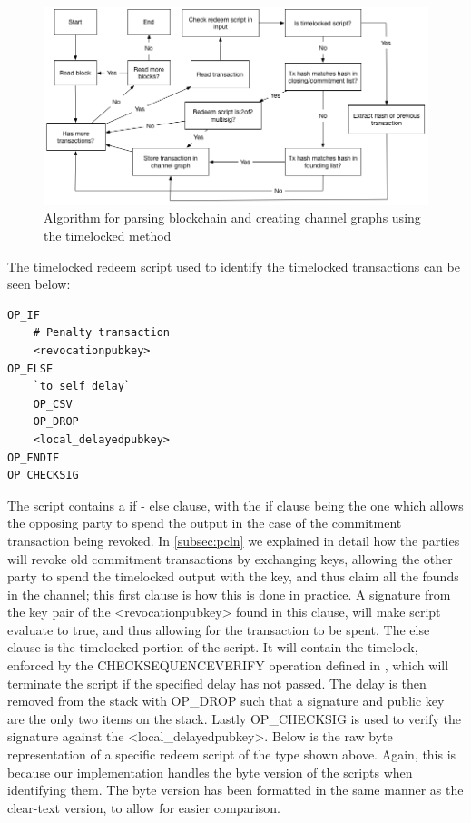 \begin{figure}[h]
    \centering
    \includegraphics[width=12cm]{figures/algo2.png}
    \caption{Algorithm for parsing blockchain and creating channel graphs using the timelocked method}
    \label{fig:algo2}
\end{figure}

The timelocked redeem script \cite{bolt3} used to identify the timelocked transactions can be seen below:

\begin{verbatim}
OP_IF
    # Penalty transaction
    <revocationpubkey>
OP_ELSE
    `to_self_delay`
    OP_CSV
    OP_DROP
    <local_delayedpubkey>
OP_ENDIF
OP_CHECKSIG
\end{verbatim}

The script contains a if - else clause, with the if clause being the one which allows the opposing party to spend the output in the case of the commitment transaction being revoked.  
In  \cref{subsec:pcln} we explained in detail how the parties will revoke old commitment transactions by exchanging keys, allowing the other party to spend the timelocked output with the key, and thus claim all the founds in the channel; this first clause is how this is done in practice.
A signature from the key pair of the <revocationpubkey> found in this clause, will make script evaluate to true, and thus allowing for the transaction to be spent.
The else clause is the timelocked portion of the script. It will contain the timelock, enforced by the CHECKSEQUENCEVERIFY operation defined in \cite{BIP112}, which will terminate the script if the specified delay has not passed. The delay is then removed from the stack with OP\_DROP such that a signature and public key are the only two items on the stack. Lastly OP\_CHECKSIG is used to verify the signature against the <local\_delayedpubkey>.
Below is the raw byte representation of a specific redeem script of the type shown above. Again, this is because our implementation handles the byte version of the scripts when identifying them. The byte version has been formatted in the same manner as the clear-text version, to allow for easier comparison.
\\


